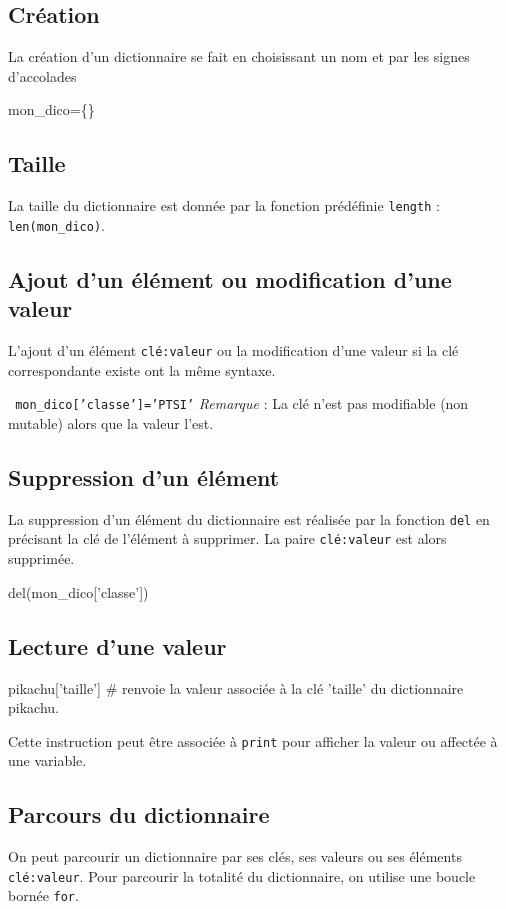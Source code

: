 \subsection*{Création}
La création d'un dictionnaire se fait en choisissant un nom et par les signes d'accolades
\begin{python}
mon\_dico=\{\}
\end{python}

\subsection*{Taille}
La taille du dictionnaire est donnée par la fonction prédéfinie \texttt{length} : 
\texttt{len(mon\_dico)}.


\subsection*{Ajout d'un élément ou modification d'une valeur}
L'ajout d'un élément \texttt{clé:valeur} ou la modification d'une valeur si la clé correspondante existe ont la même syntaxe.

\texttt{
mon\_dico['classe']='PTSI'}
\textit{Remarque} : La clé n'est pas modifiable (non mutable) alors que la valeur l'est.

\subsection*{Suppression d'un élément}
La suppression d'un élément du dictionnaire est réalisée par la fonction \texttt{del} en précisant la clé de l'élément à supprimer. La paire \texttt{clé:valeur} est alors supprimée.
\begin{python}
del(mon\_dico['classe'])
\end{python}

\subsection*{Lecture d'une valeur}

\begin{python}
pikachu['taille'] \# renvoie la valeur associée à la clé 'taille' du dictionnaire pikachu.
\end{python}
Cette instruction peut être associée à \texttt{print} pour afficher la valeur ou affectée à une variable.

\subsection*{Parcours du dictionnaire}
On peut parcourir un dictionnaire par ses clés, ses valeurs ou ses éléments \texttt{clé:valeur}. Pour parcourir la totalité du dictionnaire, on utilise une boucle bornée \texttt{for}.


